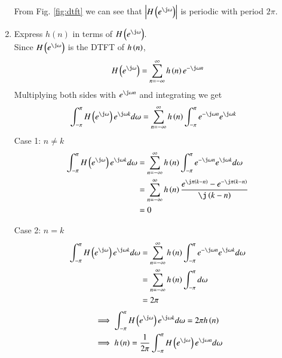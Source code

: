 \documentclass[journal,12pt,twocolumn]{IEEEtran}
\renewcommand\thesection{\arabic{section}}
\begin{document}
\begin{enumerate}[label=\thesection.\arabic*]
From Fig. \ref{fig:dtft} we can see that $\abs{H\brak{e^{\j \omega}}}$ is periodic with period $2\pi$.
\\
\item Express $h(n)$ in terms of $H\brak{e^{\j \omega}}$.\\
\solution
Since $H\brak{e^{\j \omega}}$ is the DTFT of $h\left(n\right)$,
\begin{align}
	H\brak{e^{\j \omega}} = \sum _{n=-\infty }^{\infty }h\brak{n}e^{-\j \omega n}
\end{align}
Multiplying both sides with $e^{\j \omega n}$ and integrating we get
\begin{align}
	\int_{-\pi}^{\pi}H\brak{e^{\j \omega}} e^{\j \omega k} d\omega&= \sum _{n=-\infty }^{\infty }h\brak{n}\int_{-\pi}^{\pi}e^{-\j \omega n} e^{\j \omega k}
\end{align}
Case 1: $n \neq k$
\begin{align}
	\int_{-\pi}^{\pi}H\brak{e^{\j \omega}} e^{\j \omega k} d\omega&= \sum _{n=-\infty }^{\infty }h\brak{n}\int_{-\pi}^{\pi}e^{-\j \omega n} e^{\j \omega k}d\omega \\
	&=\sum _{n=-\infty }^{\infty }h\brak{n}\frac{e^{\j \pi \brak{k-n}}- e^{-\j \pi \brak{k-n}}}{\j \brak{k-n}}\\
	&=0
\end{align}

Case 2: $n = k$
\begin{align}
	\int_{-\pi}^{\pi}H\brak{e^{\j \omega}} e^{\j \omega k} d\omega&= \sum _{n=-\infty }^{\infty }h\brak{n}\int_{-\pi}^{\pi}e^{-\j \omega n} e^{\j \omega k}d\omega \\
	&=\sum _{n=-\infty }^{\infty }h\brak{n}\int_{-\pi}^{\pi}d\omega \\
	&= 2\pi
\end{align}
\begin{align}
	&\implies \int_{-\pi}^{\pi}H\brak{e^{\j \omega}} e^{\j \omega k} d\omega =2\pi h\brak{n}\\
	&\implies h\brak{n} = \frac{1}{2\pi} \int_{-\pi}^{\pi} H\brak{e^{\j \omega}}e^{\j \omega n} d\omega
\end{align}
\end{enumerate}
\end{document}
